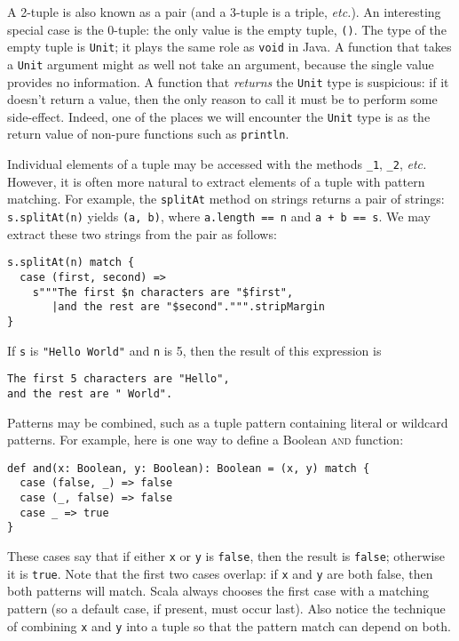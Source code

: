 A 2-tuple is also known as a pair (and a 3-tuple is a triple, \textit{etc.}). An interesting special case is the 0-tuple: the only value is the empty tuple, \verb|()|. The type of the empty tuple is \verb|Unit|; it plays the same role as \verb|void| in Java. A function that takes a \verb|Unit| argument might as well not take an argument, because the single value provides no information. A function that \emph{returns} the \verb|Unit| type is suspicious: if it doesn't return a value, then the only reason to call it must be to perform some side-effect. Indeed, one of the places we will encounter the \verb|Unit| type is as the return value of non-pure functions such as \verb|println|.

Individual elements of a tuple may be accessed with the methods \verb|_1|, \verb|_2|, \textit{etc.} However, it is often more natural to extract elements of a tuple with pattern matching. For example, the \verb|splitAt| method on strings returns a pair of strings: \verb|s.splitAt(n)| yields \verb|(a, b)|, where \verb|a.length == n| and \verb|a + b == s|. We may extract these two strings from the pair as follows:
\begin{verbatim}
s.splitAt(n) match {
  case (first, second) =>
    s"""The first $n characters are "$first",
       |and the rest are "$second".""".stripMargin
}
\end{verbatim}
If \verb|s| is \verb|"Hello World"| and \verb|n| is 5, then the result of this expression is
\begin{verbatim}
The first 5 characters are "Hello",
and the rest are " World".
\end{verbatim}

Patterns may be combined, such as a tuple pattern containing literal or wildcard patterns. For example, here is one way to define a Boolean \textsc{and} function:
\begin{verbatim}
def and(x: Boolean, y: Boolean): Boolean = (x, y) match {
  case (false, _) => false
  case (_, false) => false
  case _ => true
}
\end{verbatim}
These cases say that if either \verb|x| or \verb|y| is \verb|false|, then the result is \verb|false|; otherwise it is \verb|true|. Note that the first two cases overlap: if \verb|x| and \verb|y| are both false, then both patterns will match. Scala always chooses the first case with a matching pattern (so a default case, if present, must occur last). Also notice the technique of combining \verb|x| and \verb|y| into a tuple so that the pattern match can depend on both.

